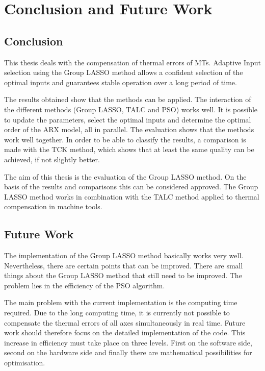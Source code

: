 \chapter{Conclusion and Future Work}

\section{Conclusion}

This thesis deals with the compensation of thermal errors of MTs. Adaptive Input selection using the Group LASSO method allows a confident selection of the optimal inputs and guarantees stable operation over a long period of time.

The results obtained show that the methods can be applied. The interaction of the different methods (Group LASSO, TALC and PSO) works well. It is possible to update the parameters, select the optimal inputs and determine the optimal order of the ARX model, all in parallel. The evaluation shows that the methods work well together. In order to be able to classify the results, a comparison is made with the TCK method, which shows that at least the same quality can be achieved, if not slightly better. 

The aim of this thesis is the evaluation of the Group LASSO method. On the basis of the results and comparisons this can be considered approved. The Group LASSO method works in combination with the TALC method applied to thermal compensation in machine tools.

\section{Future Work}

The implementation of the Group LASSO method basically works very well. Nevertheless, there are certain points that can be improved. There are small things about the Group LASSO method that still need to be improved. The problem lies in the efficiency of the PSO algorithm.

The main problem with the current implementation is the computing time required. Due to the long computing time, it is currently not possible to compensate the thermal errors of all axes simultaneously in real time. Future work should therefore focus on the detailed implementation of the code. This increase in efficiency must take place on three levels. First on the software side, second on the hardware side and finally there are mathematical possibilities for optimisation.

